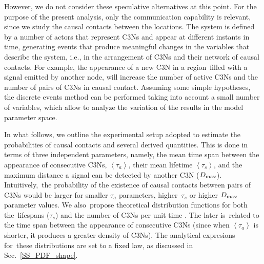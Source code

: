 \documentclass[crop]{CSLB}
\newcommand{\ceti}{C3N}
\newcommand{\cetis}{C3Ns}
\begin{document}
%
However, we do not consider these speculative alternatives at this point.
%
For the purpose of the present analysis, only the communication capability is
relevant, since we study the causal contacts between the locations.
%
The system is defined by a number of actors that represent \cetis{} and appear
at different instants in time, generating events that produce meaningful
changes in the variables that describe the system, i.e., in the arrangement of
\cetis{} and their network of causal contacts.
%
For example, the appearance of a new \ceti{} in a region filled with a signal
emitted by another node, will increase the number of active \cetis{} and the
number of pairs of \cetis{} in causal contact.
%
Assuming some simple hypotheses, the discrete events method can be performed
taking into account a small number of variables, which allow to analyze the
variation of the results in the model parameter space.


In what follows, we outline the experimental setup adopted to estimate the
probabilities of causal contacts and several derived quantities.
%
This is done in terms of three independent parameters, namely, the mean time
span between the appearance of consecutive \cetis{}, $\left<\tau_a\right>$,
their mean lifetime $\left<\tau_s\right>$, and the maximum distance a signal
can be detected by another \ceti{} ($D_{\rm max}$).
%
Intuitively, the probability of the existence of causal contacts between pairs
of \cetis{} would be larger for smaller $\tau_a$ parameters, higher $\tau_s$ or
higher $D_{\rm max}$ parameter values.
%
We also propose theoretical distribution functions for both the lifespans
($\tau_s$) and the number of \cetis{} per unit time
\citep{maccone_evolution_2014, Sotos_biotechnology_2019}.
%
The later is related to the time span between the appearance of consecutive
\cetis{} (since when $\left<\tau_a\right>$ is shorter, it produces a greater
density of \cetis{}).
%
The analytical expresions for these distributions are set to a fixed law, as
discussed in Sec.~\ref{SS_PDF_shape}.  
    
     
\end{document}
